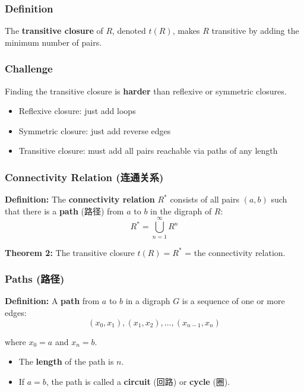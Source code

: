 \documentclass[10pt,a4paper,openany]{ctexbook}
\theoremstyle{definition}
\theoremstyle{remark}
\renewenvironment{quote}
  {\list{}{\leftmargin=1em\rightmargin=0pt\topsep=0.5pt\partopsep=0pt}\item[]}
  {\endlist}
\begin{document}
\subsubsection{Definition}

The \textbf{transitive closure} of $R$, denoted $t(R)$, makes $R$ transitive by adding the minimum number of pairs.
\subsubsection{Challenge}

Finding the transitive closure is \textbf{harder} than reflexive or symmetric closures.
\begin{itemize}
\item Reflexive closure: just add loops
\item Symmetric closure: just add reverse edges
\item Transitive closure: must add all pairs reachable via paths of any length

\end{itemize}

\subsubsection{Connectivity Relation (连通关系)}

\textbf{Definition:} The \textbf{connectivity relation} $R^*$ consists of all pairs $(a,b)$ such that there is a \textbf{path} (路径) from $a$ to $b$ in the digraph of $R$:
\[
R^* = \bigcup_{n=1}^{\infty} R^n
\]

\begin{quote}
\textbf{Theorem 2:} The transitive closure $t(R) = R^*$ = the connectivity relation.

\end{quote}
\vspace{-2pt}

\subsubsection{Paths (路径)}

\textbf{Definition:} A \textbf{path} from $a$ to $b$ in a digraph $G$ is a sequence of one or more edges:
\[
(x_0, x_1), (x_1, x_2), \dots, (x_{n-1}, x_n)
\]

where $x_0 = a$ and $x_n = b$.
\begin{itemize}
\item The \textbf{length} of the path is $n$.
\item If $a = b$, the path is called a \textbf{circuit} (回路) or \textbf{cycle} (圈).

\end{itemize}
\end{document}
